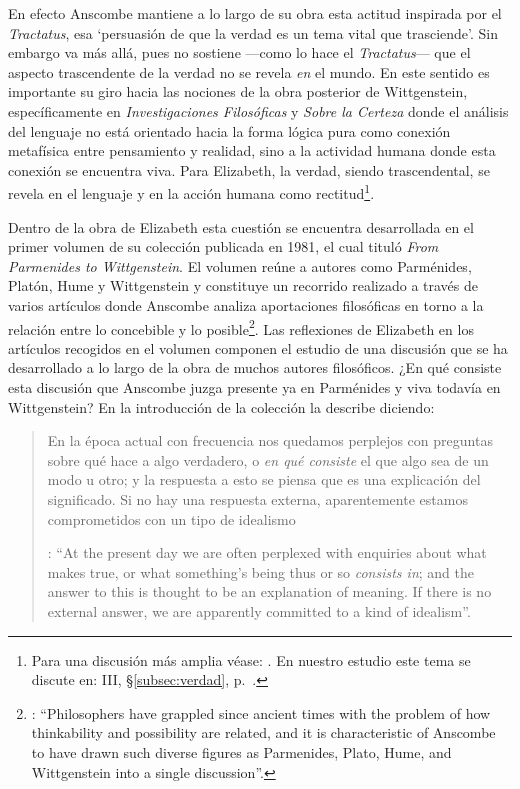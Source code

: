 En efecto Anscombe mantiene a lo largo de su obra esta actitud inspirada por el \emph{Tractatus}, esa \enquote*{persuasión de que la verdad es un tema vital que trasciende}. Sin embargo va más allá, pues no sostiene ---como lo hace el \emph{Tractatus}--- que el aspecto trascendente de la verdad no se revela \emph{en} el mundo. En este sentido es importante su giro hacia las nociones de la obra posterior de Wittgenstein, específicamente en \emph{Investigaciones Filosóficas} y \emph{Sobre la Certeza} donde el análisis del lenguaje no está orientado hacia la forma lógica pura como conexión metafísica entre pensamiento y realidad, sino a la actividad humana donde esta conexión se encuentra viva. Para Elizabeth, la verdad, siendo trascendental, se revela en el lenguaje y en la acción humana como rectitud\footnote{Para una discusión más amplia véase: \Cite{torralbaynubiola2005fayeh:unidadverdad}. En nuestro estudio este tema se discute en: III, \S\ref{subsec:verdad}, p.~\pageref{subsec:verdad}.}.

Dentro de la obra de Elizabeth esta cuestión se encuentra desarrollada en el primer volumen de su colección publicada en 1981, el cual tituló \emph{From Parmenides to Wittgenstein}. El volumen reúne a autores como Parménides, Platón, Hume y Wittgenstein y constituye un recorrido realizado a través de varios artículos donde Anscombe analiza aportaciones filosóficas en torno a la relación entre lo concebible y lo posible\footnote{\cite[Cf.][193]{teichmann2008ans}: \enquote{Philosophers have grappled since ancient times with the problem of how thinkability and possibility are related, and it is characteristic of Anscombe to have drawn such diverse figures as Parmenides, Plato, Hume, and Wittgenstein into a single discussion}.}. Las reflexiones de Elizabeth en los artículos recogidos en el volumen componen el estudio de una discusión que se ha desarrollado a lo largo de la obra de muchos autores filosóficos. ¿En qué consiste esta discusión que Anscombe juzga presente ya en Parménides y viva todavía en Wittgenstein? En la introducción de la colección la describe diciendo: 
\blockquote[{\Cite[Introduction, xi]{anscombe1981parmenides}}: \enquote{At the present day we are often perplexed with enquiries about what makes true, or what something's being thus or so \emph{consists in}; and the answer to this is thought to be an explanation of meaning. If there is no external answer, we are apparently committed to a kind of idealism}.]{En la época actual con frecuencia nos quedamos perplejos con preguntas sobre qué hace a algo verdadero, o \emph{en qué consiste} el que algo sea de un modo u otro; y la respuesta a esto se piensa que es una explicación del significado. Si no hay una respuesta externa, aparentemente estamos comprometidos con un tipo de idealismo}.\label{subsec:intextq}

